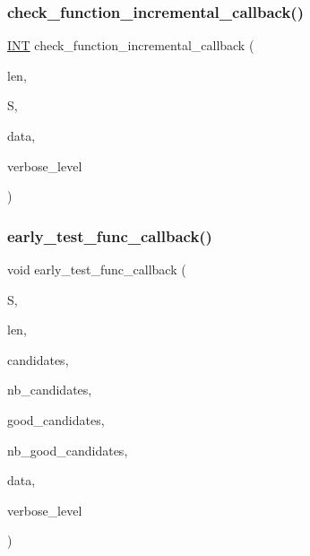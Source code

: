 \subsubsection{\texorpdfstring{check\+\_\+function\+\_\+incremental\+\_\+callback()}{check\_function\_incremental\_callback()}}
{\footnotesize\ttfamily \mbox{\hyperlink{galois_8h_a09fddde158a3a20bd2dcadb609de11dc}{I\+NT}} check\+\_\+function\+\_\+incremental\+\_\+callback (\begin{DoxyParamCaption}\item[{\mbox{\hyperlink{galois_8h_a09fddde158a3a20bd2dcadb609de11dc}{I\+NT}}}]{len,  }\item[{\mbox{\hyperlink{galois_8h_a09fddde158a3a20bd2dcadb609de11dc}{I\+NT}} $\ast$}]{S,  }\item[{void $\ast$}]{data,  }\item[{\mbox{\hyperlink{galois_8h_a09fddde158a3a20bd2dcadb609de11dc}{I\+NT}}}]{verbose\+\_\+level }\end{DoxyParamCaption})}

\mbox{\label{blt__set2_8_c_ac5b3d559ae4a7f04c7623f93300574ea}} 
\subsubsection{\texorpdfstring{early\+\_\+test\+\_\+func\+\_\+callback()}{early\_test\_func\_callback()}}
{\footnotesize\ttfamily void early\+\_\+test\+\_\+func\+\_\+callback (\begin{DoxyParamCaption}\item[{\mbox{\hyperlink{galois_8h_a09fddde158a3a20bd2dcadb609de11dc}{I\+NT}} $\ast$}]{S,  }\item[{\mbox{\hyperlink{galois_8h_a09fddde158a3a20bd2dcadb609de11dc}{I\+NT}}}]{len,  }\item[{\mbox{\hyperlink{galois_8h_a09fddde158a3a20bd2dcadb609de11dc}{I\+NT}} $\ast$}]{candidates,  }\item[{\mbox{\hyperlink{galois_8h_a09fddde158a3a20bd2dcadb609de11dc}{I\+NT}}}]{nb\+\_\+candidates,  }\item[{\mbox{\hyperlink{galois_8h_a09fddde158a3a20bd2dcadb609de11dc}{I\+NT}} $\ast$}]{good\+\_\+candidates,  }\item[{\mbox{\hyperlink{galois_8h_a09fddde158a3a20bd2dcadb609de11dc}{I\+NT}} \&}]{nb\+\_\+good\+\_\+candidates,  }\item[{void $\ast$}]{data,  }\item[{\mbox{\hyperlink{galois_8h_a09fddde158a3a20bd2dcadb609de11dc}{I\+NT}}}]{verbose\+\_\+level }\end{DoxyParamCaption})}

